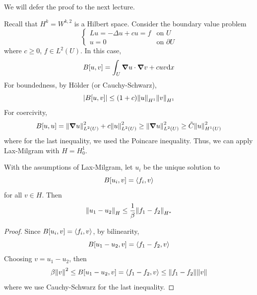 \documentclass{article}
\begin{document}
We will defer the proof to the next lecture.

\begin{example}
    Recall that \(H^k = W^{k, 2}\) is a Hilbert space. Consider the boundary value problem
    \[\begin{cases}
        Lu = -\Delta u + cu = f & \text{on }U \\
        u = 0 & \text{on }\partial U
    \end{cases}\]
    where \(c \ge 0\), \(f \in L^2(U)\). In this case,
    \[B[u, v] = \int_U\grad u \cdot \grad v + cuv \dd x\]
    For boundedness, by H\"older (or Cauchy-Schwarz),
    \[\abs{B[u, v]} \le (1 + c)\norm{u}_{H^1}\norm{v}_{H^1}\]
    For coercivity,
    \[B[u, u] = \norm{\grad u}_{L^2(U)}^2 + c\norm{u}_{L^2(U)}^2 \ge \norm{\grad u}_{L^2(U)}^2 \ge \tilde C\norm{u}_{H^1(U)}^2\]
    where for the last inequality, we used the Poincare inequality. Thus, we can apply Lax-Milgram with \(H = H_0^1\).
\end{example}

\begin{corollary}
     With the assumptions of Lax-Milgram, let \(u_i\) be the unique solution to
    \[B[u_i, v] = \left\langle f_i, v \right\rangle\]
    for all \(v \in H\). Then
    \[\norm{u_1 - u_2}_H \le \frac{1}{\beta}\norm{f_1 - f_2}_{H^*}\]
\end{corollary}

\begin{proof}
    Since \(B[u_i, v] = \left\langle f_i, v \right\rangle\), by bilinearity,
    \[B[u_1 - u_2, v] = \left\langle f_1 - f_2, v \right\rangle\]
    Choosing \(v = u_1 - u_2\), then
    \[\beta\norm{v}^2 \le B[u_1 - u_2, v] = \left\langle f_1 - f_2, v \right\rangle \le \norm{f_1 - f_2}\norm{v}\]
    where we use Cauchy-Schwarz for the last inequality.
\end{proof}

\lec
\end{document}

